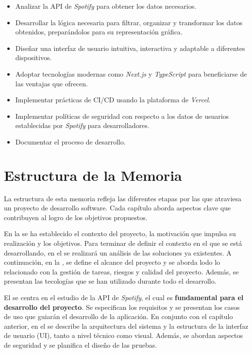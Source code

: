 \begin{itemize}
    \item Analizar la API de \textit{Spotify} para obtener los datos necesarios.
    \item Desarrollar la lógica necesaria para filtrar, organizar y transformar los datos obtenidos, preparándolos para su representación gráfica.
    \item Diseñar una interfaz de usuario intuitiva, interactiva y adaptable a diferentes dispositivos.
    \item Adoptar tecnologías modernas como \textit{Next.js} y \textit{TypeScript} para beneficiarse de las ventajas que ofrecen.
    \item Implementar prácticas de CI/CD usando la plataforma de \textit{Vercel}.
    \item Implementar políticas de seguridad con respecto a los datos de usuarios establecidas por \textit{Spotify} para desarrolladores.
    \item Documentar el proceso de desarrollo.
\end{itemize}

\section{Estructura de la Memoria}

La estructura de esta memoria refleja las diferentes etapas por las que atraviesa un proyecto de desarrollo software. Cada capítulo aborda aspectos clave que contribuyen al logro de los objetivos propuestos.

En la  se ha establecido el contexto del proyecto, la motivación que impulsa su realización y los objetivos. Para terminar de definir el contexto en el que se está desarrollando, en el  se realizará un análisis de las soluciones ya existentes. A continuación, en la , se define el alcance del proyecto y se aborda lodo lo relacionado con la gestión de tareas, riesgos y calidad del proyecto. Además, se presentan las tecologías que se han utilizado durante todo el desarrollo.

El  se centra en el estudio de la API de \textit{Spotify}, el cual es \textbf{fundamental para el desarrollo del proyecto}. Se especifican los requisitos y se presentan los casos de uso que guiarán el desarrollo de la aplicación. En conjunto con el capítulo anterior, en el  se describe la arquitectura del sistema y la estructura de la interfaz de usuario (UI), tanto a nivel técnico como visual. Además, se abordan aspectos de seguridad y se planifica el diseño de las pruebas.

